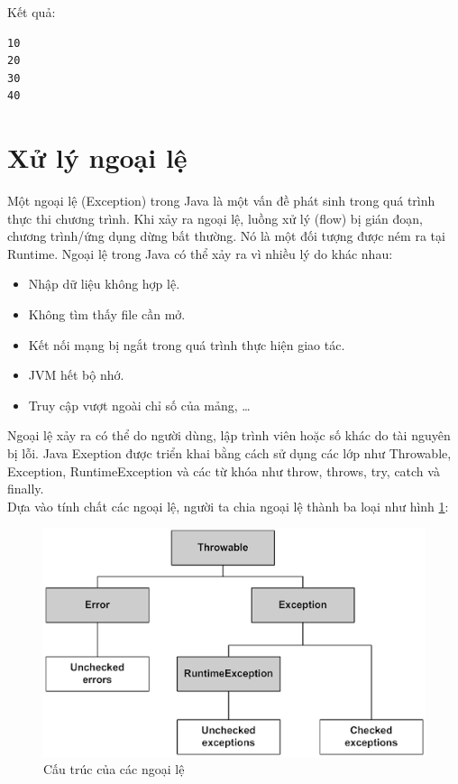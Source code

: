\indent Kết quả:
\begin{verbatim}
10
20
30
40
\end{verbatim}

\section{Xử lý ngoại lệ}
\indent Một ngoại lệ (Exception) trong Java là một vấn đề phát sinh trong quá trình thực thi chương trình. Khi xảy ra ngoại lệ, luồng xử lý (flow) bị gián đoạn, chương trình/ứng dụng dừng bất thường. Nó là một đối tượng được ném ra tại Runtime. Ngoại lệ trong Java có thể xảy ra vì nhiều lý do khác nhau: 
\begin{itemize}
\item Nhập dữ liệu không hợp lệ.
\item Không tìm thấy file cần mở.
\item Kết nối mạng bị ngắt trong quá trình thực hiện giao tác.
\item JVM hết bộ nhớ.
\item Truy cập vượt ngoài chỉ số của mảng, …
\end{itemize}
\indent Ngoại lệ xảy ra có thể do người dùng, lập trình viên hoặc số khác do tài nguyên bị lỗi. Java Exeption được triển khai bằng cách sử dụng các lớp như {\ttfamily Throwable, Exception, RuntimeException} và các từ khóa như {\ttfamily throw, throws, try, catch và finally}.\\
\indent Dựa vào tính chất các ngoại lệ, người ta chia ngoại lệ thành ba loại như hình \ref{hinh17}:
\begin{figure}[!ht]
\centering
\includegraphics[scale=0.76]{Figures//Hinh17.png}
\caption{Cấu trúc của các ngoại lệ}\label{hinh17} 
\end{figure}

